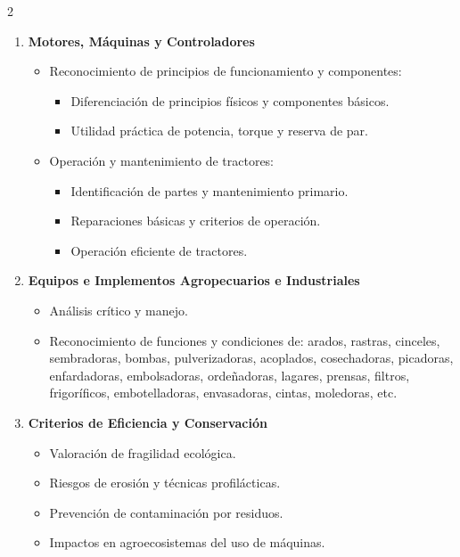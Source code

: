 \documentclass[../main]{subfiles}
\begin{document}
\begin{multicols}{2}

\begin{enumerate}
\item \textbf{Motores, Máquinas y Controladores}
    \begin{itemize}
        \item Reconocimiento de principios de funcionamiento y componentes:
        \begin{itemize}
            \item Diferenciación de principios físicos y componentes básicos.
            \item Utilidad práctica de potencia, torque y reserva de par.
        \end{itemize}
        \item Operación y mantenimiento de tractores:
        \begin{itemize}
            \item Identificación de partes y mantenimiento primario.
            \item Reparaciones básicas y criterios de operación.
            \item Operación eficiente de tractores.
        \end{itemize}
    \end{itemize}

\item \textbf{Equipos e Implementos Agropecuarios e Industriales}
    \begin{itemize}
        \item Análisis crítico y manejo.
        \item Reconocimiento de funciones y condiciones de: arados, rastras, cinceles, sembradoras, bombas, pulverizadoras, acoplados, cosechadoras, picadoras, enfardadoras, embolsadoras, ordeñadoras, lagares, prensas, filtros, frigoríficos, embotelladoras, envasadoras, cintas, moledoras, etc.
    \end{itemize}

\item \textbf{Criterios de Eficiencia y Conservación}
    \begin{itemize}
        \item Valoración de fragilidad ecológica.
        \item Riesgos de erosión y técnicas profilácticas.
        \item Prevención de contaminación por residuos.
        \item Impactos en agroecosistemas del uso de máquinas.
    \end{itemize}
\end{enumerate}

\end{multicols}
\end{document}
